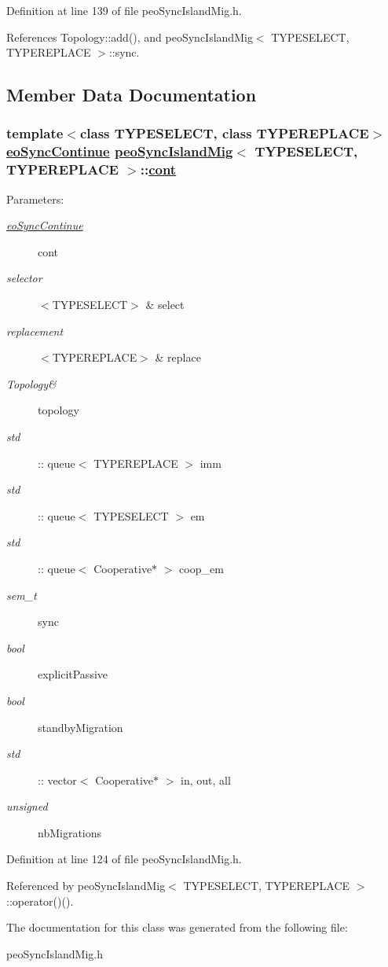 Definition at line 139 of file peo\-Sync\-Island\-Mig.h.

References Topology::add(), and peo\-Sync\-Island\-Mig$<$ TYPESELECT, TYPEREPLACE $>$::sync.

\subsection{Member Data Documentation}
\hypertarget{classpeoSyncIslandMig_a64e7c9da149773c5d264d128a1ea37a}{
\subsubsection[cont]{\setlength{\rightskip}{0pt plus 5cm}template$<$class TYPESELECT, class TYPEREPLACE$>$ \hyperlink{classeoSyncContinue}{eo\-Sync\-Continue} \hyperlink{classpeoSyncIslandMig}{peo\-Sync\-Island\-Mig}$<$ TYPESELECT, TYPEREPLACE $>$::\hyperlink{classpeoSyncIslandMig_a64e7c9da149773c5d264d128a1ea37a}{cont}}}
\label{classpeoSyncIslandMig_a64e7c9da149773c5d264d128a1ea37a}


\begin{Desc}
\item[Parameters:]
\begin{description}
\item[{\em \hyperlink{classeoSyncContinue}{eo\-Sync\-Continue}}]cont \item[{\em selector}]$<$TYPESELECT$>$ \& select \item[{\em replacement}]$<$TYPEREPLACE$>$ \& replace \item[{\em Topology\&}]topology \item[{\em std}]:: queue$<$ TYPEREPLACE $>$ imm \item[{\em std}]:: queue$<$ TYPESELECT $>$ em \item[{\em std}]:: queue$<$ Cooperative$\ast$ $>$ coop\_\-em \item[{\em sem\_\-t}]sync \item[{\em bool}]explicit\-Passive \item[{\em bool}]standby\-Migration \item[{\em std}]:: vector$<$ Cooperative$\ast$ $>$ in, out, all \item[{\em unsigned}]nb\-Migrations \end{description}
\end{Desc}


Definition at line 124 of file peo\-Sync\-Island\-Mig.h.

Referenced by peo\-Sync\-Island\-Mig$<$ TYPESELECT, TYPEREPLACE $>$::operator()().

The documentation for this class was generated from the following file:\begin{CompactItemize}
\item 
peo\-Sync\-Island\-Mig.h\end{CompactItemize}
